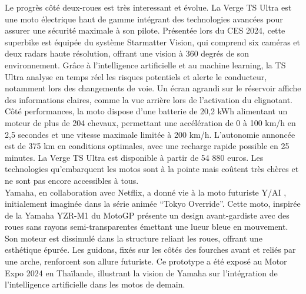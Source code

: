 \documentclass{article}
\begin{document}
Le progrès côté deux-roues est très interessant et évolue.
La Verge TS Ultra est une moto électrique \cite{lenoir_cette_2024} haut de gamme intégrant des technologies avancées pour assurer une sécurité maximale à son pilote. Présentée lors du CES 2024, cette superbike est équipée du système Starmatter Vision, qui comprend six caméras et deux radars haute résolution, offrant une vision à 360 degrés de son environnement. Grâce à l’intelligence artificielle et au machine learning, la TS Ultra analyse en temps réel les risques potentiels et alerte le conducteur, notamment lors des changements de voie. Un écran agrandi sur le réservoir affiche des informations claires, comme la vue arrière lors de l’activation du clignotant. Côté performances, la moto dispose d’une batterie de 20,2 kWh alimentant un moteur de plus de 204 chevaux, permettant une accélération de 0 à 100 km/h en 2,5 secondes et une vitesse maximale limitée à 200 km/h. L’autonomie annoncée est de 375 km en conditions optimales, avec une recharge rapide possible en 25 minutes. La Verge TS Ultra est disponible à partir de 54 880 euros.
Les technologies qu'embarquent les motos sont à la pointe mais coûtent très chères et ne sont pas encore accessibles à tous.
\\
Yamaha, en collaboration avec Netflix, a donné vie à la moto futuriste Y/AI \cite{texier_quand_2024} , initialement imaginée dans la série animée “Tokyo Override”. Cette moto, inspirée de la Yamaha YZR-M1 du MotoGP présente un design avant-gardiste avec des roues sans rayons semi-transparentes émettant une lueur bleue en mouvement. Son moteur est dissimulé dans la structure reliant les roues, offrant une esthétique épurée. Les guidons, fixés sur les côtés des fourches avant et reliés par une arche, renforcent son allure futuriste. Ce prototype a été exposé au Motor Expo 2024 en Thaïlande, illustrant la vision de Yamaha sur l’intégration de l’intelligence artificielle dans les motos de demain.
\end{document}
